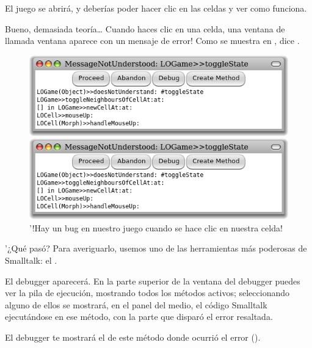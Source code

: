 \documentclass[a4paper,10pt,twoside]{book}
\begin{document}
El juego se abrir\'a, y deber\'ias poder hacer clic en las celdas y ver como funciona. 

Bueno, demasiada teor\'ia\ldots{}
Cuando haces clic en una celda, una ventana de  llamada ventana  aparece con un mensaje de error!
Como se muestra en , dice .

\begin{figure}[ht]
\ifluluelse
	{\centerline{\includegraphics[width=\textwidth]{Error}}}
	{\centerline{\includegraphics[scale=0.7]{Error}}}
\caption{'!Hay un bug en nuestro juego cuando se hace clic en nuestra celda!
}
\end{figure}

\noindent
'¿Qu\'e pas\'o? Para averiguarlo, usemos uno de las herramientas m\'as poderosas de Smalltalk: el .

El debugger aparecer\'a.
En la parte superior de la ventana del debugger puedes ver la pila de ejecuci\'on, mostrando todos los m\'etodos activos; seleccionando alguno de ellos se mostrar\'a, en el panel del medio, el c\'odigo Smalltalk ejecut\'andose en ese m\'etodo, con la parte que dispar\'o el error resaltada. 

El debugger te mostrar\'a el  de este m\'etodo donde ocurri\'o el error ().
\end{document}
